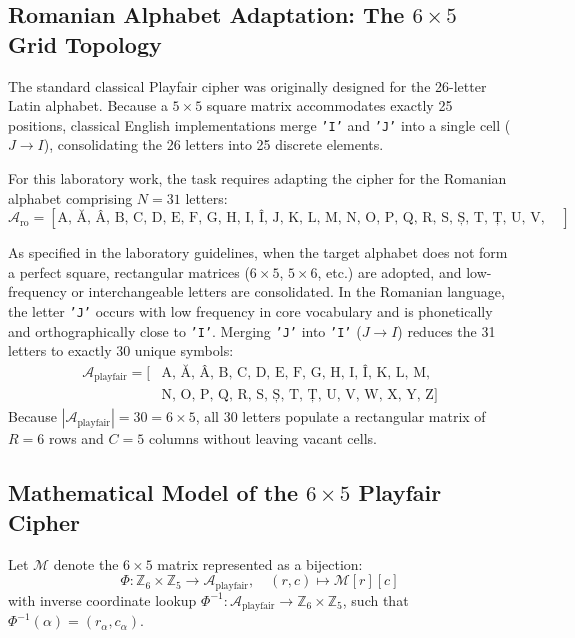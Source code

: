 \documentclass{labreport}
\begin{document}
\subsection{Romanian Alphabet Adaptation: The \texorpdfstring{$6 \times 5$}{6x5} Grid Topology}
The standard classical Playfair cipher was originally designed for the 26-letter Latin alphabet. Because a $5 \times 5$ square matrix accommodates exactly 25 positions, classical English implementations merge \texttt{'I'} and \texttt{'J'} into a single cell ($J \to I$), consolidating the 26 letters into 25 discrete elements.

For this laboratory work, the task requires adapting the cipher for the Romanian alphabet comprising $N = 31$ letters:
\begin{equation}
\mathcal{A}_{\text{ro}} = [\text{A, Ă, Â, B, C, D, E, F, G, H, I, Î, J, K, L, M, N, O, P, Q, R, S, Ș, T, Ț, U, V, W, X, Y, Z}]
\end{equation}

As specified in the laboratory guidelines, when the target alphabet does not form a perfect square, rectangular matrices ($6 \times 5$, $5 \times 6$, etc.) are adopted, and low-frequency or interchangeable letters are consolidated. In the Romanian language, the letter \texttt{'J'} occurs with low frequency in core vocabulary and is phonetically and orthographically close to \texttt{'I'}. Merging \texttt{'J'} into \texttt{'I'} ($J \to I$) reduces the 31 letters to exactly 30 unique symbols:
\begin{equation}
\begin{split}
\mathcal{A}_{\text{playfair}} = [&\text{A, Ă, Â, B, C, D, E, F, G, H, I, Î, K, L, M,} \\
&\text{N, O, P, Q, R, S, Ș, T, Ț, U, V, W, X, Y, Z}]
\end{split}
\end{equation}
Because $|\mathcal{A}_{\text{playfair}}| = 30 = 6 \times 5$, all 30 letters populate a rectangular matrix of $R = 6$ rows and $C = 5$ columns without leaving vacant cells.

\subsection{Mathematical Model of the \texorpdfstring{$6 \times 5$}{6x5} Playfair Cipher}
Let $\mathcal{M}$ denote the $6 \times 5$ matrix represented as a bijection:
\begin{equation}
\Phi: \mathbb{Z}_6 \times \mathbb{Z}_5 \to \mathcal{A}_{\text{playfair}}, \quad (r, c) \mapsto \mathcal{M}[r][c]
\end{equation}
with inverse coordinate lookup $\Phi^{-1}: \mathcal{A}_{\text{playfair}} \to \mathbb{Z}_6 \times \mathbb{Z}_5$, such that $\Phi^{-1}(\alpha) = (r_\alpha, c_\alpha)$.
\end{document}
